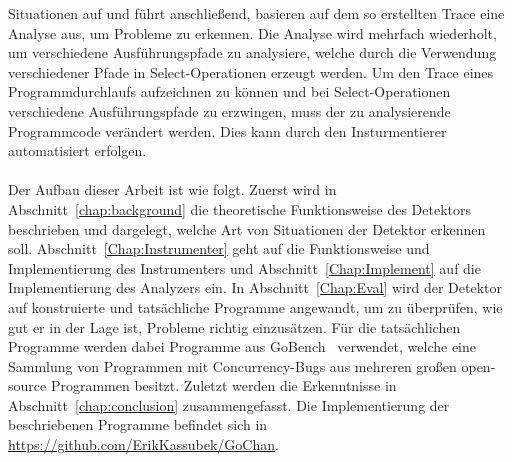 Situationen auf und führt anschließend, basieren auf dem so erstellten Trace 
eine Analyse aus, um Probleme zu erkennen. Die Analyse wird mehrfach wiederholt, 
um verschiedene Ausführungspfade zu analysiere, welche durch die Verwendung 
verschiedener Pfade in Select-Operationen erzeugt werden. Um den Trace eines 
Programmdurchlaufs aufzeichnen zu können und bei Select-Operationen verschiedene 
Ausführungspfade zu erzwingen, muss der zu analysierende Programmcode 
verändert werden. Dies kann durch den Insturmentierer automatisiert erfolgen.\\\\
Der Aufbau dieser Arbeit ist wie folgt. Zuerst wird in Abschnitt~\ref{chap:background}
die theoretische Funktionsweise des Detektors beschrieben und dargelegt, 
welche Art von Situationen der Detektor erkennen soll. 
Abschnitt~\ref{Chap:Instrumenter} geht auf die Funktionsweise und Implementierung 
des Instrumenters und Abschnitt~\ref{Chap:Implement} auf die Implementierung 
des Analyzers ein. In Abschnitt~\ref{Chap:Eval} wird der Detektor auf 
konstruierte und tatsächliche Programme angewandt, um zu überprüfen, 
wie gut er in der Lage ist, Probleme richtig einzusätzen. Für die 
tatsächlichen Programme werden dabei Programme aus GoBench~\cite{gobench}
verwendet, welche eine Sammlung von Programmen mit Concurrency-Bugs aus 
mehreren großen open-source Programmen besitzt. Zuletzt werden die 
Erkenntnisse in Abschnitt~\ref{chap:conclusion} zusammengefasst. Die Implementierung
der beschriebenen Programme befindet sich in \url{https://github.com/ErikKassubek/GoChan}.
